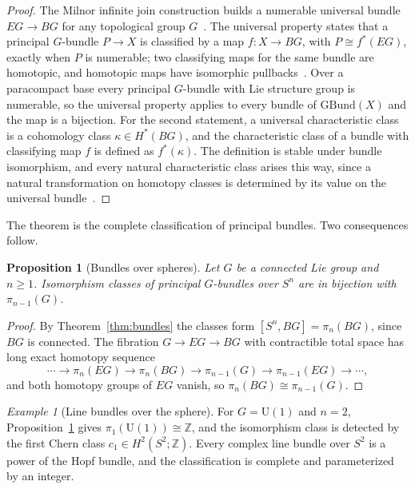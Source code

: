 \documentclass[11pt,letterpaper]{article}
\newtheorem{proposition}[theorem]{Proposition}
\theoremstyle{definition}
\theoremstyle{remark}
\newtheorem{example}[theorem]{Example}
\begin{document}
\begin{proof}
The Milnor infinite join construction builds a numerable universal bundle $EG \to BG$ for any topological group $G$~\cite{milnor}. The universal property states that a principal $G$-bundle $P \to X$ is classified by a map $f: X \to BG$, with $P \cong f^*(EG)$, exactly when $P$ is numerable; two classifying maps for the same bundle are homotopic, and homotopic maps have isomorphic pullbacks~\cite{dold, steenrod}. Over a paracompact base every principal $G$-bundle with Lie structure group is numerable, so the universal property applies to every bundle of $\mathrm{GBund}(X)$ and the map is a bijection. For the second statement, a universal characteristic class is a cohomology class $\kappa \in H^*(BG)$, and the characteristic class of a bundle with classifying map $f$ is defined as $f^*(\kappa)$. The definition is stable under bundle isomorphism, and every natural characteristic class arises this way, since a natural transformation on homotopy classes is determined by its value on the universal bundle~\cite{milnor-stasheff}.
\end{proof}

The theorem is the complete classification of principal bundles. Two consequences follow.

\begin{proposition}[Bundles over spheres]
\label{prop:spheres}
Let $G$ be a connected Lie group and $n \geq 1$. Isomorphism classes of principal $G$-bundles over $S^n$ are in bijection with $\pi_{n-1}(G)$.
\end{proposition}

\begin{proof}
By Theorem~\ref{thm:bundles} the classes form $[S^n, BG] = \pi_n(BG)$, since $BG$ is connected. The fibration $G \to EG \to BG$ with contractible total space has long exact homotopy sequence
\[
\cdots \to \pi_n(EG) \to \pi_n(BG) \to \pi_{n-1}(G) \to \pi_{n-1}(EG) \to \cdots,
\]
and both homotopy groups of $EG$ vanish, so $\pi_n(BG) \cong \pi_{n-1}(G)$.
\end{proof}

\begin{example}[Line bundles over the sphere]
\label{ex:line}
For $G = \mathrm{U}(1)$ and $n = 2$, Proposition~\ref{prop:spheres} gives $\pi_1(\mathrm{U}(1)) \cong \mathbb{Z}$, and the isomorphism class is detected by the first Chern class $c_1 \in H^2(S^2; \mathbb{Z})$. Every complex line bundle over $S^2$ is a power of the Hopf bundle, and the classification is complete and parameterized by an integer.
\end{example}
\end{document}
